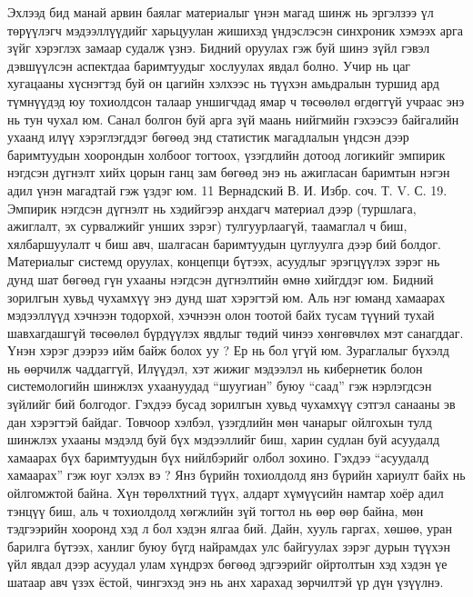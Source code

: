 Эхлээд бид манай арвин баялаг материалыг үнэн магад шинж нь эргэлзээ үл төрүүлэгч мэдээллүүдийг харьцуулан жишихэд үндэслэсэн синхроник хэмээх арга зүйг хэрэглэх замаар судалж үзнэ. Бидний оруулах гэж буй шинэ зүйл гэвэл дэвшүүлсэн аспектдаа баримтуудыг хослуулах явдал болно. Учир нь цаг хугацааны хүснэгтэд буй он цагийн хэлхээс нь түүхэн амьдралын туршид ард түмнүүдэд юу тохиолдсон талаар уншигчдад ямар ч төсөөлөл өгдөггүй учраас энэ нь тун чухал юм. Санал болгон буй арга зүй маань нийгмийн гэхээсээ байгалийн ухаанд илүү хэрэглэгддэг бөгөөд энд статистик магадлалын үндсэн дээр баримтуудын хоорондын холбоог тогтоох, үзэгдлийн дотоод логикийг эмпирик нэгдсэн дүгнэлт хийх цорын ганц зам бөгөөд энэ нь ажигласан баримтын нэгэн адил үнэн магадтай гэж үздэг юм.
11 Вернадский В. И. Избр. соч. Т. V. С. 19.
Эмпирик нэгдсэн дүгнэлт нь хэдийгээр анхдагч материал дээр (туршлага, ажиглалт, эх сурвалжийг унших зэрэг) тулгуурлаагүй, таамаглал ч биш, хялбаршуулалт ч биш авч, шалгасан баримтуудын цуглуулга дээр бий болдог. Материалыг системд оруулах, концепци бүтээх, асуудлыг эрэгцүүлэх зэрэг нь дунд шат бөгөөд гүн ухааны нэгдсэн дүгнэлтийн өмнө хийгддэг юм. Бидний зорилгын хувьд чухамхүү энэ дунд шат хэрэгтэй юм.
Аль нэг юманд хамаарах мэдээллүүд хэчнээн тодорхой, хэчнээн олон тоотой байх тусам түүний тухай шавхагдашгүй төсөөлөл бүрдүүлэх явдлыг төдий чинээ хөнгөвчлөх мэт санагддаг. Үнэн хэрэг дээрээ ийм байж болох уу ? Ер нь бол үгүй юм. Зураглалыг бүхэлд нь өөрчилж чаддаггүй, Илүүдэл, хэт жижиг мэдээлэл нь кибернетик болон системологийн шинжлэх ухаануудад “шуугиан” буюу “саад” гэж нэрлэгдсэн зүйлийг бий болгодог. Гэхдээ бусад зорилгын хувьд чухамхүү сэтгэл санааны эв дан хэрэгтэй байдаг. Товчоор хэлбэл, үзэгдлийн мөн чанарыг ойлгохын тулд шинжлэх ухааны мэдэлд буй бүх мэдээллийг биш, харин судлан буй асуудалд хамаарах бүх баримтуудын бүх нийлбэрийг олбол зохино.
Гэхдээ “асуудалд хамаарах” гэж юуг хэлэх вэ ? Янз бүрийн тохиолдолд янз бүрийн хариулт байх нь ойлгомжтой байна. Хүн төрөлхтний түүх, алдарт хүмүүсийн намтар хоёр адил тэнцүү биш, аль ч тохиолдолд хөгжлийн зүй тогтол нь өөр өөр байна, мөн тэдгээрийн хооронд хэд л бол хэдэн ялгаа бий. Дайн, хууль гаргах, хөшөө, уран барилга бүтээх, ханлиг буюу бүгд найрамдах улс байгуулах зэрэг дурын түүхэн үйл явдал дээр асуудал улам хүндрэх бөгөөд эдгээрийг ойртолтын хэд хэдэн үе шатаар авч үзэх ёстой, чингэхэд энэ нь анх харахад зөрчилтэй үр дүн үзүүлнэ.
